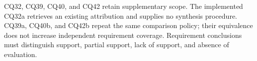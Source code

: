 \endgroup

CQ32, CQ39, CQ40, and CQ42 retain supplementary scope. The implemented
CQ32a retrieves an existing attribution and supplies no synthesis
procedure. CQ39a, CQ40b, and CQ42b repeat the same comparison policy;
their equivalence does not increase independent requirement coverage.
Requirement conclusions must distinguish support, partial support,
lack of support, and absence of evaluation.
